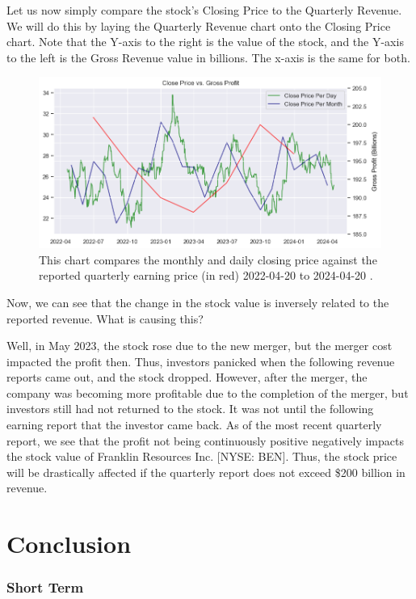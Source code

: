 \documentclass[9pt,a4paper,twoside]{tau}
\begin{document}
        Let us now simply compare the stock's Closing Price to the Quarterly Revenue. We will do this by laying the Quarterly Revenue chart onto the Closing Price chart. Note that the Y-axis to the right is the value of the stock, and the Y-axis to the left is the Gross Revenue value in billions. The x-axis is the same for both.
            \begin{figure}[H]
                \centering
                \includegraphics[width=0.85\columnwidth]{Figures/CloseDataVsProfit.png}
                \caption{This chart compares the monthly and daily closing price against the reported quarterly earning price (in red) 2022-04-20 to 2024-04-20 \cite{yahoo-finance-2024} \cite{alpha-vantage-2024}.}
                \label{fig:figure}
            \end{figure}
        
        Now, we can see that the change in the stock value is inversely related to the reported revenue. What is causing this?

        Well, in May 2023, the stock rose due to the new merger, but the merger cost impacted the profit then. Thus, investors panicked when the following revenue reports came out, and the stock dropped. However, after the merger, the company was becoming more profitable due to the completion of the merger, but investors still had not returned to the stock. It was not until the following earning report that the investor came back. As of the most recent quarterly report, we see that the profit not being continuously positive negatively impacts the stock value of Franklin Resources Inc. [NYSE: BEN]. Thus, the stock price will be drastically affected if the quarterly report does not exceed \$200 billion in revenue. 

\section{Conclusion}
    \subsubsection{Short Term}
    
\end{document}
